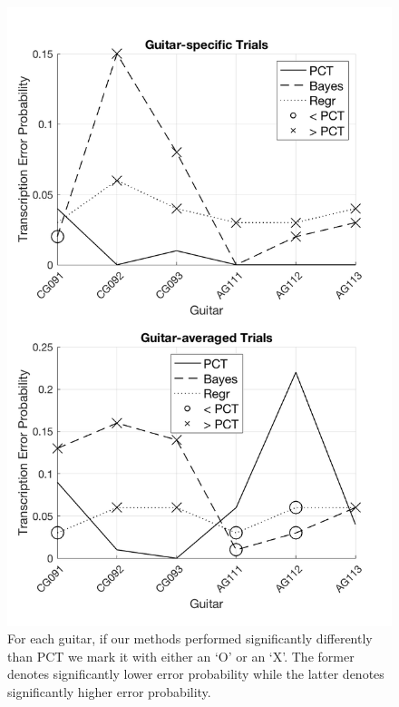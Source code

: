 \documentclass[convention,peer-reviewed]{aesconf}
\begin{document}
\begin{figure}[!t]
\centering
\includegraphics[scale=0.25]{sig-comp-PCT}
\caption{For each guitar, if our methods performed significantly differently than PCT we mark it with either an `O' or an `X'. The former denotes significantly lower error probability while the latter denotes significantly higher error probability.}
\label{fig:sig-comp-PCT}
\end{figure}
\end{document}
